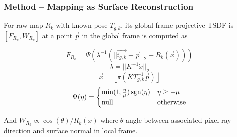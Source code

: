 \begin{frame}
\frametitle{Method -- Mapping as Surface Reconstruction}

For raw map $R_k$ with known pose $T_{g,k}$, its global frame projective
TSDF is $[F_{R_k}, W_{R_k}]$ at a point $\vec{p}$ in the global frame is computed as

\[ F_{R_k} = \Psi\left( \lambda^{-1} (||\vec{t_{g,k}} - \vec{p}||_2 - R_k(\vec{x}))\right) \]
\[ \lambda = ||K^{-1}\dot{x}||_2 \]
\[ \vec{x} = \left\lfloor \pi (KT^{-1}_{g,k}\vec{p})\right\rfloor \]
\[ \Psi(\eta) = \begin{cases}
\min(1, \frac{\eta}{\mu}) \operatorname{sgn}(\eta) & \eta \geq - \mu \\
\text{null} & \text{otherwise}
\end{cases} \]

And $W_{R_k} \propto \cos (\theta) / R_k(x)$ where $\theta$ angle between
associated pixel ray direction and surface normal in local frame.

\end{frame}
